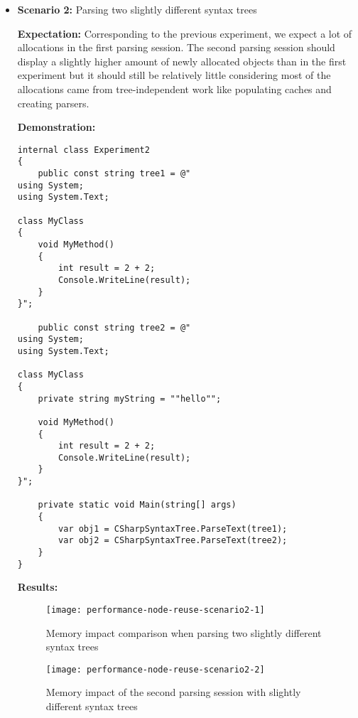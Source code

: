 \begin{itemize}
\item \textbf{Scenario 2:} Parsing two slightly different syntax trees

\textbf{Expectation:} Corresponding to the previous experiment, we expect a lot of allocations in the first parsing session. The second parsing session should display a slightly higher amount of newly allocated objects than in the first experiment but it should still be relatively little considering most of the allocations came from tree-independent work like populating caches and creating parsers.

\clearpage

\begin{minipage}{\linewidth}
\textbf{Demonstration:} 

\begin{lstlisting}
internal class Experiment2
{
	public const string tree1 = @"
using System;
using System.Text;

class MyClass 
{
    void MyMethod()
    {
        int result = 2 + 2;
        Console.WriteLine(result);
    }
}";

	public const string tree2 = @"
using System;
using System.Text;

class MyClass 
{
    private string myString = ""hello"";

    void MyMethod()
    {
        int result = 2 + 2;
        Console.WriteLine(result);
    }
}";

	private static void Main(string[] args)
	{
		var obj1 = CSharpSyntaxTree.ParseText(tree1);
		var obj2 = CSharpSyntaxTree.ParseText(tree2);
	}
}
\end{lstlisting}
\end{minipage}

\textbf{Results:}

\begin{figure}[H]
\centering
\texttt{[image: performance-node-reuse-scenario2-1]}
\caption{Memory impact comparison when parsing two slightly different syntax trees}
\label{img:performance-node-reuse-scenario2-1}
\end{figure}

\begin{figure}[H]
\centering
\texttt{[image: performance-node-reuse-scenario2-2]}
\caption{Memory impact of the second parsing session with slightly different syntax trees}
\label{img:performance-node-reuse-scenario2-2}
\end{figure}


\end{itemize}
